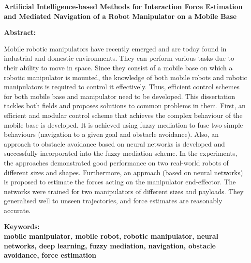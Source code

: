 

\newpage
\setlength{\parindent}{0in}
{\fontsize{14}{18}\bf {Artificial Intelligence-based Methods for Interaction Force Estimation and Mediated Navigation of a Robot Manipulator on a Mobile Base}}

\vskip 15mm
\textbf{Abstract:\\}	
	
\textnormal{Mobile robotic manipulators have recently emerged and are today found in industrial and domestic environments. They can perform various tasks due to their ability to move in space. Since they consist of a mobile base on which a robotic manipulator is mounted, the knowledge of both mobile robots and robotic manipulators is required to control it effectively. Thus, efficient control schemes for both mobile base and manipulator need to be developed. This dissertation tackles both fields and proposes solutions to common problems in them. First, an efficient and modular control scheme that achieves the complex behaviour of the mobile base is developed. It is achieved using fuzzy mediation to fuse two simple behaviours (navigation to a given goal and obstacle avoidance). Also, an approach to obstacle avoidance based on neural networks is developed and successfully incorporated into the fuzzy mediation scheme. In the experiments, the approaches demonstrated good performance on two real-world robots of different sizes and shapes.  Furthermore, an approach (based on neural networks) is proposed to estimate the forces acting on the manipulator end-effector. The networks were trained for two manipulators of different sizes and payloads. They generalised well to unseen trajectories, and force estimates are reasonably accurate.}
	
\vskip 15mm
\bf{Keywords:\\}
\textnormal{mobile manipulator, mobile robot, robotic manipulator, neural networks, deep learning, fuzzy mediation, navigation, obstacle avoidance, force estimation}
